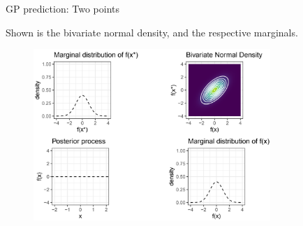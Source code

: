 \begin{vbframe}{GP prediction: Two points}

\begin{footnotesize}
  Shown is the bivariate normal density, and the respective marginals. 
\end{footnotesize}\vspace*{0.2cm}

\begin{figure}
  \includegraphics[width=0.8\textwidth]{figure_man/GP01.png}
\end{figure}


\end{vbframe}

